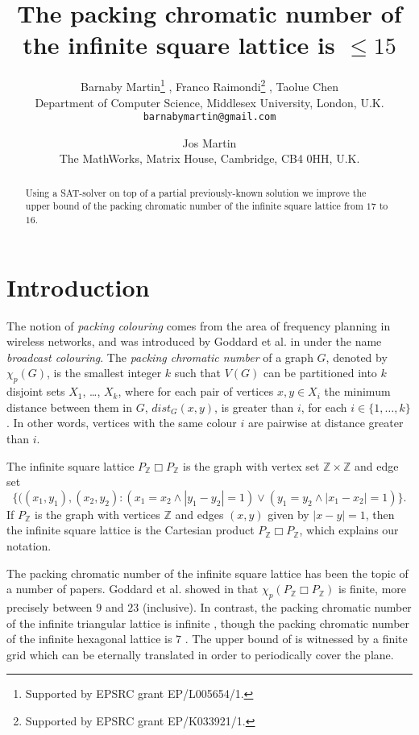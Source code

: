\documentclass[a4paper,12pt]{article}
\title{The packing chromatic number of the infinite square lattice is $\leq 15$}
\author{
Barnaby Martin\thanks{Supported by EPSRC grant EP/L005654/1.} , Franco Raimondi\thanks{Supported by EPSRC grant EP/K033921/1.} , Taolue Chen \\ 
Department of Computer Science, Middlesex University, London, U.K. \\
\texttt{barnabymartin@gmail.com}
\and
Jos Martin \\
The MathWorks, Matrix House, Cambridge, CB4 0HH, U.K.}
\theoremstyle{remark}
\begin{document}
\maketitle

\begin{abstract}
Using a SAT-solver on top of a partial previously-known solution we improve the upper bound of the packing chromatic number of the infinite square lattice from $17$ to $16$.
\end{abstract}

\section{Introduction}

The notion of \emph{packing colouring} comes from the area of frequency planning in wireless networks, and was introduced by Goddard et \mbox{al.} in \cite{BroadcastChromaticNumber} under the name \emph{broadcast colouring}. The \emph{packing chromatic number} of a graph $G$, denoted by $\chi_p(G)$, is the smallest integer $k$ such that $V(G)$ can be partitioned into $k$ disjoint sets $X_1$, \ldots, $X_k$, where for each pair of vertices $x,y \in X_i$ the minimum distance between them in $G$, $\mathit{dist}_G(x, y)$, is greater than $i$, for each $i\in \{1,\ldots,k\}$. In other words,
vertices with the same colour $i$ are pairwise at distance greater than $i$.

The infinite square lattice $P_\mathbb{Z} \Box P_\mathbb{Z}$ is the graph with vertex set $\mathbb{Z} \times \mathbb{Z}$ and edge set 
\[ \{((x_1,y_1),(x_2,y_2) : (x_1=x_2 \wedge |y_1-y_2|=1) \vee  (y_1=y_2 \wedge |x_1-x_2|=1)\}.\]
If $P_\mathbb{Z}$ is the graph with vertices $\mathbb{Z}$ and edges $(x,y)$ given by $|x-y|=1$, then the infinite square lattice is the Cartesian product  $P_\mathbb{Z} \Box P_\mathbb{Z}$, which explains our notation.

The packing chromatic number of the infinite square lattice has been the topic of a number of papers. Goddard et \mbox{al.} showed in \cite{BroadcastChromaticNumber} that $\chi_p(P_\mathbb{Z} \Box P_\mathbb{Z})$ is finite, more precisely between $9$ and $23$ (inclusive). In contrast, the packing chromatic number of the infinite triangular lattice is infinite \cite{FinbowRall07}, though the packing chromatic number of the infinite hexagonal lattice is $7$ \cite{HexagonalLattice7}. The upper bound of \cite{BroadcastChromaticNumber} is witnessed by a finite grid which can be eternally translated in order to periodically cover the plane.
\end{document}
